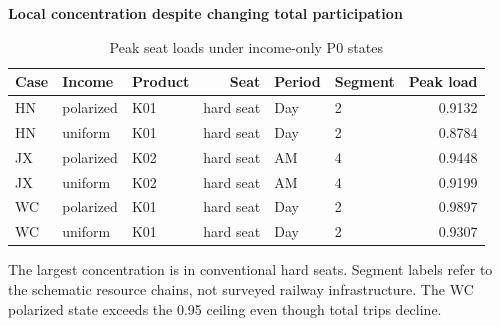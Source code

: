 \begin{table}[htbp]\centering
\caption{Peak seat loads under income-only P0 states}\label{tab:review_peaks}
\begin{minipage}{.95\textwidth}\fontsize{8}{10}\selectfont{}\setlength{\tabcolsep}{2pt}\renewcommand{\arraystretch}{1.08}
\par\noindent\textbf{Local concentration despite changing total participation}\par\smallskip
\begin{tabular*}{\linewidth}{@{\extracolsep{\fill}}lllrllr@{}}\toprule
Case & Income & Product & Seat & Period & Segment & Peak load \\
\midrule
HN & polarized & K01 & hard seat & Day & 2 & 0.9132 \\
HN & uniform & K01 & hard seat & Day & 2 & 0.8784 \\
JX & polarized & K02 & hard seat & AM & 4 & 0.9448 \\
JX & uniform & K02 & hard seat & AM & 4 & 0.9199 \\
WC & polarized & K01 & hard seat & Day & 2 & 0.9897 \\
WC & uniform & K01 & hard seat & Day & 2 & 0.9307 \\
\bottomrule\end{tabular*}\par\medskip
\par\noindent\fontsize{8}{9.5}\selectfont The largest concentration is in conventional hard seats. Segment labels refer to the schematic resource chains, not surveyed railway infrastructure. The WC polarized state exceeds the 0.95 ceiling even though total trips decline.
\end{minipage}\end{table}
